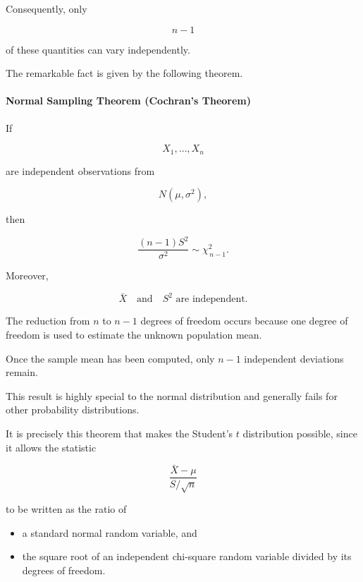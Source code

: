 \documentclass[11pt]{article}
\begin{document}
\begin{mdframed}[
		linewidth=0.8pt,
		roundcorner=6pt,
		backgroundcolor=gray!5,
		linecolor=gray!60,
		innertopmargin=10pt,
		innerbottommargin=10pt,
		innerleftmargin=10pt,
		innerrightmargin=10pt
		]
		Consequently, only
		
		\[
		n-1
		\]
		
		of these quantities can vary independently.
		
		The remarkable fact is given by the following theorem.
		
		\paragraph{Normal Sampling Theorem (Cochran's Theorem)}
		
		If
		
		\[
		X_1,\ldots,X_n
		\]
		
		are independent observations from
		
		\[
		N(\mu,\sigma^2),
		\]
		
		then
		
		\[
		\boxed{
			\frac{(n-1)S^2}{\sigma^2}
			\sim
			\chi^2_{\,n-1}.
		}
		\]
		
		Moreover,
		
		\[
		\boxed{
			\bar X
			\quad\text{and}\quad
			S^2
			\text{ are independent.}
		}
		\]
		
		The reduction from $n$ to $n-1$ degrees of freedom occurs because one degree
		of freedom is used to estimate the unknown population mean.
		
		Once the sample mean has been computed, only $n-1$ independent deviations
		remain.
		
		This result is highly special to the normal distribution and generally
		fails for other probability distributions.
		
		It is precisely this theorem that makes the Student's $t$ distribution
		possible, since it allows the statistic
		
		\[
		\frac{\bar X-\mu}{S/\sqrt n}
		\]
		
		to be written as the ratio of
		
		\begin{itemize}
			\item a standard normal random variable, and
			\item the square root of an independent chi-square random variable divided
			by its degrees of freedom.
		\end{itemize}
		
	\end{mdframed}
	
\end{document}
